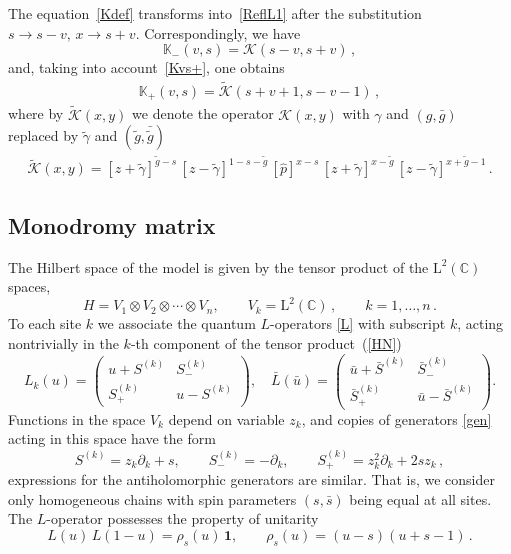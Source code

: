 \documentclass[a4paper,11pt]{article}
\numberwithin{equation}{section}
\begin{document}
The equation~\eqref{Kdef} transforms into~\eqref{ReflL1} after the substitution
$s\to s-v, \, x\to s+v$.
Correspondingly, we have
\begin{equation} \nonumber
	\mathbb{K}_-(v,s) = \mathcal{K}(s-v,s+v) \,,
\end{equation}
and, taking into account~\eqref{Kvs+}, one obtains
\begin{align}\nonumber
	\mathbb{K}_+(v,s) = \tilde{\mathcal{K}}(s+v+1,s-v-1) \,,
\end{align}	
where by $\tilde{\mathcal{K}}(x,y)$ we denote the operator $\mathcal{K}(x,y)$ with $\gamma$ and $(g,\bar{g})$ replaced by $\tilde{\gamma}$ and $(\tilde{g},\bar{\tilde{g}})$
\begin{align} \label{Kop-d-tilde}
	\tilde{\mathcal{K}}(x,y) =
	[z+\tilde{\gamma}]^{\tilde{g}-s} \,
	[z-\tilde{\gamma}]^{1-s-\tilde{g}} \,
	[\hat{p}]^{x-s} \,
	[z+\tilde{\gamma}]^{x-\tilde{g}} \,
	[z-\tilde{\gamma}]^{x+\tilde{g}-1} \,.
\end{align}


\subsection{Monodromy matrix} \label{sect:Monodromy}

The Hilbert space of the model is given by the tensor product of the $\mathrm{L}^2(\mathbb{C})$ spaces,
\begin{equation}\label{HN}
	H=V_1\otimes V_2\otimes\cdots\otimes V_n,  \qquad V_k=\mathrm{L}^2(\mathbb{C})\,,\qquad
	k=1,\ldots,n \,.
\end{equation}
To each site $k$ we associate the quantum $L$-operators \eqref{L}
with subscript $k$, acting nontrivially in the $k$-th component of the tensor product~(\ref{HN})
\begin{equation} \nonumber
	L_k(u) =
	\left (\begin{array}{cc}
		u + S^{(k)} & S_{-}^{(k)} \\
		S_{+}^{(k)} & u - S^{(k)} \end{array} \right ) , \quad 
	\bar L(\bar u) = \left(\begin{array}{cc}
		\bar u + \bar S^{(k)} & \bar S_{-}^{(k)}\\
		\bar S_{+}^{(k)}& \bar u - \bar S^{(k)}
	\end{array}\right) .
\end{equation}
Functions in the space $V_k$ depend on variable $z_k$, and copies of generators \eqref{gen} acting in this space have the form
\begin{equation} \nonumber
	S^{(k)} = z_k\partial_k + s, \qquad  S^{(k)}_- = -\partial_k, \qquad
	S^{(k)}_+ = z_k^2\partial_k+2sz_k \,,
\end{equation}
expressions for the antiholomorphic generators are similar. That is, we consider only homogeneous chains with spin parameters $(s,\bar{s})$ being equal at all sites.\\
The $L$-operator possesses the property of unitarity 
\begin{equation} \label{unitarity}
	L(u)\,L(1-u) = \rho_s(u)\,\bm{1}, \qquad \rho_s(u) = (u-s)(u+s-1) \,.
\end{equation} 
\end{document}
